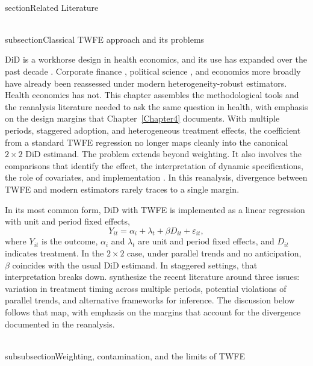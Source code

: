 \documentclass[11pt]{article}
\begin{document}
\\section{Related Literature}
\label{Chapter2}

\\subsection{Classical TWFE approach and its problems}

DiD is a workhorse design in health economics, and its use has expanded over the past decade \parencite{goldsmith2024tracking}. Corporate finance \parencite{baker2022much}, political science \parencite{chiu2026causal}, and economics more broadly \parencite{brodeur2026reproducibility} have already been reassessed under modern heterogeneity-robust estimators. Health economics has not. This chapter assembles the methodological tools and the reanalysis literature needed to ask the same question in health, with emphasis on the design margins that Chapter~\ref{Chapter4} documents. With multiple periods, staggered adoption, and heterogeneous treatment effects, the coefficient from a standard TWFE regression no longer maps cleanly into the canonical \(2\times 2\) DiD estimand. The problem extends beyond weighting. It also involves the comparisons that identify the effect, the interpretation of dynamic specifications, the role of covariates, and implementation \parencite{dechaisemartin2020twfe, callaway2021difference, sun2021estimating, borusyak2023did_imputation, wooldridge2025two}. In this reanalysis, divergence between TWFE and modern estimators rarely traces to a single margin.

In its most common form, DiD with TWFE is implemented as a linear regression with unit and period fixed effects,
\begin{equation}
Y_{it} = \alpha_i + \lambda_t + \beta D_{it} + \varepsilon_{it},
\label{eq:twfe_static}
\end{equation}
where \(Y_{it}\) is the outcome, \(\alpha_i\) and \(\lambda_t\) are unit and period fixed effects, and \(D_{it}\) indicates treatment. In the \(2\times 2\) case, under parallel trends and no anticipation, \(\beta\) coincides with the usual DiD estimand. In staggered settings, that interpretation breaks down. \textcite{roth2023s} synthesize the recent literature around three issues: variation in treatment timing across multiple periods, potential violations of parallel trends, and alternative frameworks for inference. The discussion below follows that map, with emphasis on the margins that account for the divergence documented in the reanalysis.

\\subsubsection{Weighting, contamination, and the limits of TWFE}
\end{document}
